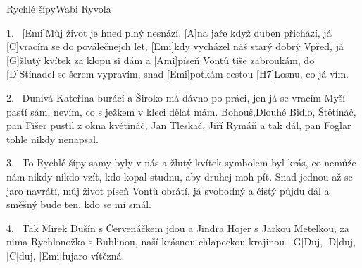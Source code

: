 \begin{song}{Rychlé šípy}{Wabi Ryvola}

\begin{xverse}{1.~}
[Emi]Můj život je hned plný nesnází,
[A]na jaře když duben přichází,
já [C]vracím se do poválečnejch let,
[Emi]kdy vycházel náš starý dobrý Vpřed,
já [G]{žlu}tý kvítek za klopu si dám
a [Ami]píseň Vontů tiše zabroukám,
do [D]Stínadel se šerem vypravím,
snad [Emi]potkám cestou [H7]Losnu, co já vím.
\end{xverse}


\begin{xverse}{2.~}
Dunivá Kateřina burácí
a Široko má dávno po práci,
jen já se vracím Myší pastí sám,
nevím, co s ježkem v kleci dělat mám.
Bohouš,Dlouhé Bidlo, Štětináč,
pan Fišer pustil z okna květináč,
Jan Tleskač, Jiří Rymáň a tak dál,
pan Foglar tohle nikdy nenapsal.
\end{xverse}


\begin{xverse}{3.~}
To Rychlé šípy samy byly v nás
a žlutý kvítek symbolem byl krás,
co nemůže nám nikdy nikdo vzít,
kdo kopal studnu, aby druhej moh pít.
Snad jednou až se jaro navrátí,
můj život píseň Vontů obrátí,
já svobodný a čistý půjdu dál
a směšný bude ten. kdo se mi smál.
\end{xverse}


\begin{xverse}{4.~}
Tak Mirek Dušín s Červenáčkem jdou
a Jindra Hojer s Jarkou Metelkou,
za nima Rychlonožka s Bublinou,
naší krásnou chlapeckou krajinou.
[G]Duj, [D]duj, [C]duj, [Emi]fujaro vítězná.
\end{xverse}
\end{song}

